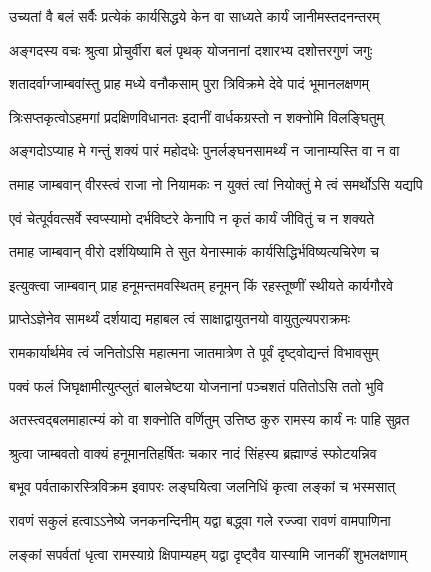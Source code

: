 
\twolineshloka
{उच्यतां वै बलं सर्वैः प्रत्येकं कार्यसिद्धये}
{केन वा साध्यते कार्यं जानीमस्तदनन्तरम्} %

\twolineshloka
{अङ्गदस्य वचः श्रुत्वा प्रोचुर्वीरा बलं पृथक्}
{योजनानां दशारभ्य दशोत्तरगुणं जगुः} %

\twolineshloka
{शतादर्वाग्जाम्बवांस्तु प्राह मध्ये वनौकसाम्}
{पुरा त्रिविक्रमे देवे पादं भूमानलक्षणम्} %

\twolineshloka
{त्रिःसप्तकृत्वोऽहमगां प्रदक्षिणविधानतः}
{इदानीं वार्धकग्रस्तो न शक्नोमि विलङ्घितुम्} %

\twolineshloka
{अङ्गदोऽप्याह मे गन्तुं शक्यं पारं महोदधेः}
{पुनर्लङ्घनसामर्थ्यं न जानाम्यस्ति वा न वा} %

\twolineshloka
{तमाह जाम्बवान् वीरस्त्वं राजा नो नियामकः}
{न युक्तं त्वां नियोक्तुं मे त्वं समर्थोऽसि यद्यपि} %


\twolineshloka
{एवं चेत्पूर्ववत्सर्वे स्वप्स्यामो दर्भविष्टरे}
{केनापि न कृतं कार्यं जीवितुं च न शक्यते} %

\twolineshloka
{तमाह जाम्बवान् वीरो दर्शयिष्यामि ते सुत}
{येनास्माकं कार्यसिद्धिर्भविष्यत्यचिरेण च} %

\twolineshloka
{इत्युक्त्वा जाम्बवान् प्राह हनूमन्तमवस्थितम्}
{हनूमन् किं रहस्तूष्णीं स्थीयते कार्यगौरवे} %

\twolineshloka
{प्राप्तेऽज्ञेनेव सामर्थ्यं दर्शयाद्य महाबल}
{त्वं साक्षाद्वायुतनयो वायुतुल्यपराक्रमः} %

\twolineshloka
{रामकार्यार्थमेव त्वं जनितोऽसि महात्मना}
{जातमात्रेण ते पूर्वं दृष्ट्वोद्यन्तं विभावसुम्} %

\twolineshloka
{पक्वं फलं जिघृक्षामीत्युत्प्लुतं बालचेष्टया}
{योजनानां पञ्चशतं पतितोऽसि ततो भुवि} %

\twolineshloka
{अतस्त्वद्बलमाहात्म्यं को वा शक्नोति वर्णितुम्}
{उत्तिष्ठ कुरु रामस्य कार्यं नः पाहि सुव्रत} %

\twolineshloka
{श्रुत्वा जाम्बवतो वाक्यं हनूमानतिहर्षितः}
{चकार नादं सिंहस्य ब्रह्माण्डं स्फोटयन्निव} %

\twolineshloka
{बभूव पर्वताकारस्त्रिविक्रम इवापरः}
{लङ्घयित्वा जलनिधिं कृत्वा लङ्कां च भस्मसात्} %

\twolineshloka
{रावणं सकुलं हत्वाऽऽनेष्ये जनकनन्दिनीम्}
{यद्वा बद्ध्वा गले रज्ज्वा रावणं वामपाणिना} %

\twolineshloka
{लङ्कां सपर्वतां धृत्वा रामस्याग्रे क्षिपाम्यहम्}
{यद्वा दृष्ट्वैव यास्यामि जानकीं शुभलक्षणाम्} %

